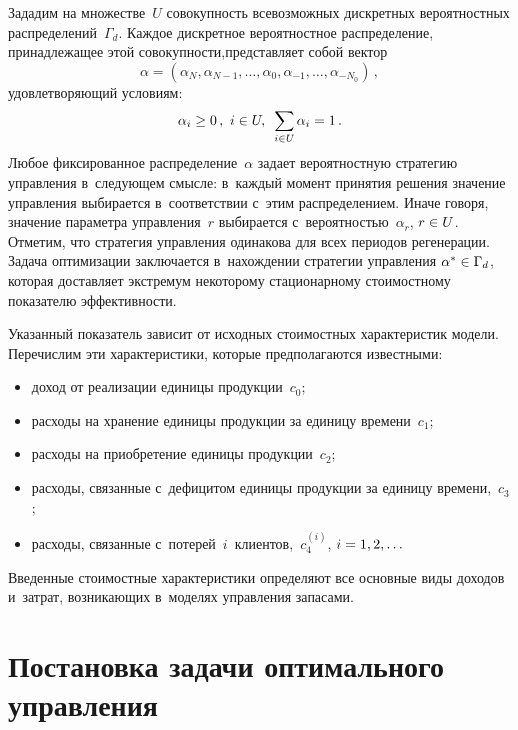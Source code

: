 \begin{multicols}{2}
  Зададим на множестве~$U$ совокупность всевозможных дискретных 
вероятностных распределений~$\Gamma_d$. Каж\-дое дискретное вероятностное 
распределение, принадлежащее этой со\-во\-куп\-ности,\linebreak пред\-став\-ля\-ет собой вектор 
$$
\alpha= (\alpha_N, \alpha_{N-1}, \ldots , \alpha_0, \alpha_{-1},\ldots , \alpha_{-
N_0})\,,
$$
 удовлетворяющий условиям: 
 $$
 \alpha_i\hm\geq 0\,,\ i \in U,\enskip 
\sum\limits_{i\in U} \alpha_i=1\,.
$$
 Любое фиксированное 
распределение~$\alpha$ задает вероятностную стратегию управ\-ле\-ния 
в~сле\-ду\-ющем смыс\-ле: в~каж\-дый момент принятия решения значение 
управления выбирается в~соответствии с~этим распределением. Иначе говоря, 
значение па\-ра\-мет\-ра управ\-ле\-ния~$r$ выбирается с~вероятностью~$\alpha_r$, 
$r\hm\in U$. Отметим, что стратегия управ\-ле\-ния одинакова для всех периодов 
регенерации. Задача оптимизации за\-клю\-ча\-ет\-ся в~на\-хож\-де\-нии стратегии 
управ\-ле\-ния $\alpha^*\hm\in \Gamma_d$, которая доставляет экстремум 
некоторому стационарному стоимостному показателю эф\-фек\-тив\-ности.
  
  Указанный показатель зависит от исходных стоимостных характеристик 
модели. Перечислим эти характеристики, которые предполагаются известными:
  \begin{itemize}
  \item доход от реализации единицы продукции~$c_0$;
  \item расходы на хранение единицы продукции за единицу времени~$c_1$;
  \item расходы на приобретение единицы продукции~$c_2$;
  \item расходы, связанные с~дефицитом единицы продукции за единицу 
времени,~$c_3$;
  \item расходы, связанные с~потерей~$i$~клиентов,~$c_4^{(i)}$, $i\hm= 
1,2,\ldots$
  \end{itemize}
  
  Введенные стоимостные характеристики определяют все основные виды 
доходов и~за\-трат, воз\-ни\-ка\-ющих в~моделях управ\-ле\-ния запасами.

\section{Постановка задачи оптимального управления}


\end{multicols}
